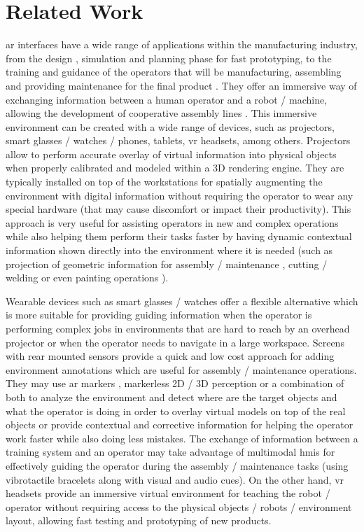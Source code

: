 \section{Related Work}\label{sec:related-work}

\gls{ar} interfaces \cite{Bimber2005} have a wide range of applications within the manufacturing industry, from the design \cite{Nee2012}, simulation and planning phase for fast prototyping, to the training and guidance \cite{Webel2011} of the operators that will be manufacturing, assembling and providing maintenance for the final product \cite{Zhu2014}. They offer an immersive way of exchanging information between a human operator and a robot / machine, allowing the development of cooperative assembly lines \cite{Lenz2011}. This immersive environment can be created with a wide range of devices, such as projectors, smart glasses / watches / phones, tablets, \gls{vr} headsets, among others. Projectors allow to perform accurate overlay of virtual information into physical objects when properly calibrated \cite{Moreno2012} and modeled within a 3D rendering engine. They are typically installed on top of the workstations for spatially augmenting the environment with digital information without requiring the operator to wear any special hardware (that may cause discomfort or impact their productivity). This approach is very useful for assisting operators in new and complex operations while also helping them perform their tasks faster by having dynamic contextual information shown directly into the environment where it is needed (such as projection of geometric information for assembly / maintenance \cite{Uva2018}, cutting / welding \cite{Doshi2017} or even painting operations \cite{Barbosa2014}).

Wearable devices such as smart glasses / watches offer a flexible alternative \cite{MICHALOS2018194} which is more suitable for providing guiding information when the operator is performing complex jobs in environments that are hard to reach by an overhead projector or when the operator needs to navigate in a large workspace. Screens with rear mounted sensors provide a quick and low cost approach for adding environment annotations which are useful for assembly / maintenance operations. They may use \gls{ar} markers \cite{Siltanen2012}, markerless 2D / 3D perception \cite{Guo2014} or a combination of both to analyze the environment and detect where are the target objects and what the operator is doing \cite{Bannat2008} in order to overlay virtual models on top of the real objects or provide contextual and corrective information for helping the operator work faster while also doing less mistakes. The exchange of information between a training system and an operator may take advantage of multimodal \glspl{hmi} \cite{Webel2013} for effectively guiding the operator during the assembly / maintenance tasks (using vibrotactile bracelets along with visual and audio cues). On the other hand, \gls{vr} headsets provide an immersive virtual environment for teaching the robot / operator \cite{ABATE2009318} without requiring access to the physical objects / robots / environment layout, allowing fast testing and prototyping of new products.
